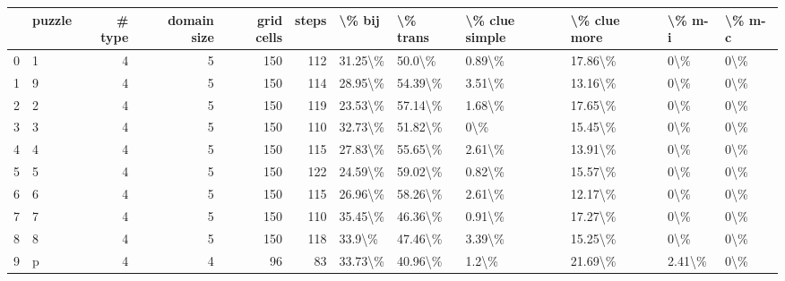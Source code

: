 \begin{tabular}{llrrrrllllll}
\toprule
{} & puzzle &  \# type &  domain size &  grid cells &  steps &   \textbackslash \% bij & \textbackslash \% trans & \textbackslash \% clue simple & \textbackslash \% clue more &  \textbackslash \% m-i & \textbackslash \% m-c \\
\midrule
0 &      1 &       4 &            5 &         150 &    112 &  31.25\textbackslash \% &   50.0\textbackslash \% &         0.89\textbackslash \% &      17.86\textbackslash \% &     0\textbackslash \% &    0\textbackslash \% \\
1 &      9 &       4 &            5 &         150 &    114 &  28.95\textbackslash \% &  54.39\textbackslash \% &         3.51\textbackslash \% &      13.16\textbackslash \% &     0\textbackslash \% &    0\textbackslash \% \\
2 &      2 &       4 &            5 &         150 &    119 &  23.53\textbackslash \% &  57.14\textbackslash \% &         1.68\textbackslash \% &      17.65\textbackslash \% &     0\textbackslash \% &    0\textbackslash \% \\
3 &      3 &       4 &            5 &         150 &    110 &  32.73\textbackslash \% &  51.82\textbackslash \% &            0\textbackslash \% &      15.45\textbackslash \% &     0\textbackslash \% &    0\textbackslash \% \\
4 &      4 &       4 &            5 &         150 &    115 &  27.83\textbackslash \% &  55.65\textbackslash \% &         2.61\textbackslash \% &      13.91\textbackslash \% &     0\textbackslash \% &    0\textbackslash \% \\
5 &      5 &       4 &            5 &         150 &    122 &  24.59\textbackslash \% &  59.02\textbackslash \% &         0.82\textbackslash \% &      15.57\textbackslash \% &     0\textbackslash \% &    0\textbackslash \% \\
6 &      6 &       4 &            5 &         150 &    115 &  26.96\textbackslash \% &  58.26\textbackslash \% &         2.61\textbackslash \% &      12.17\textbackslash \% &     0\textbackslash \% &    0\textbackslash \% \\
7 &      7 &       4 &            5 &         150 &    110 &  35.45\textbackslash \% &  46.36\textbackslash \% &         0.91\textbackslash \% &      17.27\textbackslash \% &     0\textbackslash \% &    0\textbackslash \% \\
8 &      8 &       4 &            5 &         150 &    118 &   33.9\textbackslash \% &  47.46\textbackslash \% &         3.39\textbackslash \% &      15.25\textbackslash \% &     0\textbackslash \% &    0\textbackslash \% \\
9 &      p &       4 &            4 &          96 &     83 &  33.73\textbackslash \% &  40.96\textbackslash \% &          1.2\textbackslash \% &      21.69\textbackslash \% &  2.41\textbackslash \% &    0\textbackslash \% \\
\bottomrule
\end{tabular}
